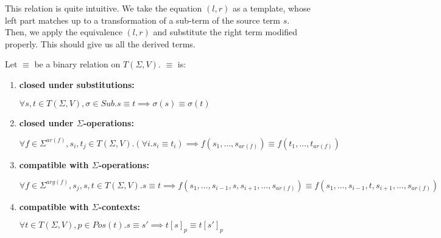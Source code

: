 This relation is quite intuitive. We take the equation $(l,r)$ as a template, whose left part matches up to a transformation of a sub-term of the source term $s$. Then, we apply the equivalence $(l,r)$ and substitute the right term modified properly. This should give us all the derived terms. 

\begin{definition}
Let $\equiv$ be a binary relation on $T(\Sigma,V)$. $\equiv$ is:

\begin{enumerate}
\item \textbf{closed under substitutions:} 

$\forall s,t \in T(\Sigma,V), \sigma \in Sub. s \equiv t \implies \sigma(s) \equiv \sigma(t) $
\item \textbf{closed under $\Sigma$-operations:}

$\forall f \in \Sigma^{ar(f)},s_i,t_j \in T(\Sigma,V). (\forall i. s_i \equiv t_i) \implies f(s_1,\ldots,s_{ar(f)}) \equiv f(t_1,\ldots,t_{ar(f)}) $
\item \textbf{compatible with $\Sigma$-operations:} 

$\forall f \in \Sigma^{arg(f)}, s_j,s,t \in T(\Sigma,V). s \equiv t \implies f(s_1,\ldots,s_{i-1},s,s_{i+1},\ldots,s_{ar(f)}) \equiv f(s_1,\ldots,s_{i-1},t,s_{i+1},\ldots,s_{ar(f)})$
\item \textbf{compatible with $\Sigma$-contexts:}

$\forall t \in T(\Sigma,V),p \in Pos(t). s \equiv s' \implies t[s]_p \equiv t[s']_p$
\end{enumerate}
\end{definition}

